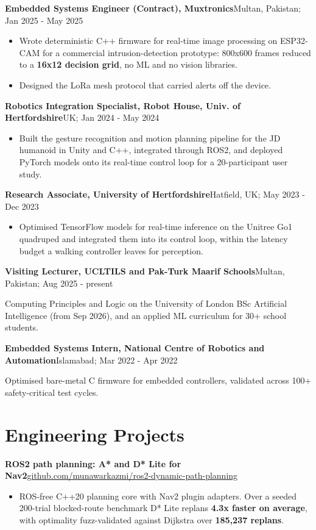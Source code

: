 \documentclass[10pt]{article}
\newcommand{\entry}[2]{{\textbf{#1}\hfill {\small #2}\par}}
\newcommand{\sub}[1]{{\small\color{dim}#1\par}}
\newcommand{\gap}{\vspace{3pt}}
\begin{document}
\gap
\entry{Embedded Systems Engineer (Contract), Muxtronics}{Multan, Pakistan; Jan 2025 - May 2025}
\begin{itemize}
\item Wrote deterministic C++ firmware for real-time image processing on ESP32-CAM for a commercial
intrusion-detection prototype: 800x600 frames reduced to a \textbf{16x12 decision grid}, no ML and no vision libraries.
\item Designed the LoRa mesh protocol that carried alerts off the device.
\end{itemize}

\gap
\entry{Robotics Integration Specialist, Robot House, Univ. of Hertfordshire}{UK; Jan 2024 - May 2024}
\begin{itemize}
\item Built the gesture recognition and motion planning pipeline for the JD humanoid in Unity and C++, integrated
through ROS2, and deployed PyTorch models onto its real-time control loop for a 20-participant user study.
\end{itemize}

\gap
\entry{Research Associate, University of Hertfordshire}{Hatfield, UK; May 2023 - Dec 2023}
\begin{itemize}
\item Optimised TensorFlow models for real-time inference on the Unitree Go1 quadruped and integrated them into its
control loop, within the latency budget a walking controller leaves for perception.
\end{itemize}

\gap
\entry{Visiting Lecturer, UCLTILS and Pak-Turk Maarif Schools}{Multan, Pakistan; Aug 2025 - present}
\sub{Computing Principles and Logic on the University of London BSc Artificial Intelligence (from Sep 2026), and an applied ML curriculum for 30+ school students.}

\gap
\entry{Embedded Systems Intern, National Centre of Robotics and Automation}{Islamabad; Mar 2022 - Apr 2022}
\sub{Optimised bare-metal C firmware for embedded controllers, validated across 100+ safety-critical test cycles.}

\section{Engineering Projects}

\entry{ROS2 path planning: A* and D* Lite for Nav2}{\href{https://github.com/munawarkazmi/ros2-dynamic-path-planning}{github.com/munawarkazmi/ros2-dynamic-path-planning}}
\begin{itemize}
\item ROS-free C++20 planning core with Nav2 plugin adapters. Over a seeded 200-trial blocked-route benchmark D* Lite
replans \textbf{4.3x faster on average}, with optimality fuzz-validated against Dijkstra over \textbf{185,237 replans}.
\end{itemize}
\end{document}
